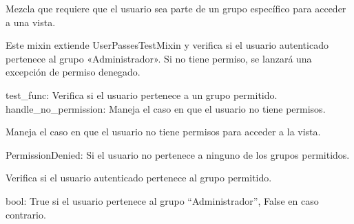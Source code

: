 \documentclass[letterpaper,10pt,spanish]{sphinxmanual}
\begin{document}
\begin{fulllineitems}

\pysigstartsignatures
{}
\pysigstopsignatures
\sphinxAtStartPar
Mezcla que requiere que el usuario sea parte de un grupo específico para acceder a una vista.

\sphinxAtStartPar
Este mixin extiende UserPassesTestMixin y verifica si el usuario autenticado pertenece
al grupo «Administrador». Si no tiene permiso, se lanzará una excepción de permiso denegado.
\begin{description}
\sphinxAtStartPar
test\_func: Verifica si el usuario pertenece a un grupo permitido.
handle\_no\_permission: Maneja el caso en que el usuario no tiene permisos.

\end{description}


\begin{fulllineitems}

\pysigstartsignatures
{}
\pysigstopsignatures
\sphinxAtStartPar
Maneja el caso en que el usuario no tiene permisos para acceder a la vista.
\begin{description}
\sphinxAtStartPar
PermissionDenied: Si el usuario no pertenece a ninguno de los grupos permitidos.

\end{description}

\end{fulllineitems}



\begin{fulllineitems}

\pysigstartsignatures
{}
\pysigstopsignatures
\sphinxAtStartPar
Verifica si el usuario autenticado pertenece al grupo permitido.
\begin{description}
\sphinxAtStartPar
bool: True si el usuario pertenece al grupo “Administrador”, False en caso contrario.

\end{description}

\end{fulllineitems}


\end{fulllineitems}
\end{document}
